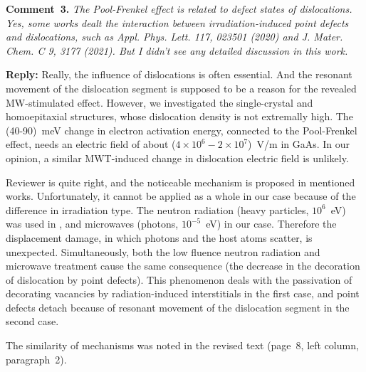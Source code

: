 \documentclass[10pt]{iopart}
\begin{document}
\vspace{1cm}
\noindent
\textcolor[rgb]{0.00,0.50,1.00}{\textbf{Comment~3.}}
\emph{The Pool-Frenkel effect is related to defect states of dislocations.
Yes, some works dealt the interaction between irradiation-induced point defects and dislocations,
such as Appl. Phys. Lett. 117, 023501 (2020) and J. Mater. Chem. C 9, 3177 (2021).
But I didn’t see any detailed discussion in this work.}

\noindent
\textcolor[rgb]{0.51,0.00,0.00}{\textbf{Reply:}}
Really, the influence of dislocations is often essential.
And the resonant movement of the dislocation segment is supposed
to be a reason for the revealed MW-stimulated effect.
However, we investigated the single-crystal and homoepitaxial structures,
whose dislocation density is not extremally high.
The (40-90)~meV change in electron activation energy, connected to the
Pool-Frenkel effect, needs  an electric field of about ($4\times10^6-2\times10^7$)~V/m in GaAs.
In our opinion, a similar MWT-induced change in dislocation electric field is unlikely.

Reviewer is quite right, and the noticeable mechanism is proposed in mentioned works.
Unfortunately, it cannot be applied as a whole in our case because of the difference in irradiation type.
The neutron radiation (heavy particles, $10^6$~eV) was used in \cite{LightNeuIrrad:1,LightNeuIrrad:2},
and microwaves (photons, $10^{-5}$~eV) in our case.
Therefore the displacement damage, in which photons and the host atoms scatter, is unexpected.
Simultaneously, both the low fluence neutron radiation and microwave treatment
cause the same consequence (the decrease in the decoration of dislocation by point defects).
This phenomenon deals with the passivation of decorating vacancies
by radiation-induced interstitials in the first case,
and point defects detach because of resonant movement of the dislocation segment in the second case.


The similarity of mechanisms was noted in the revised text
(page~8, left column, paragraph~2).





%
%
%
%
%
\end{document}
